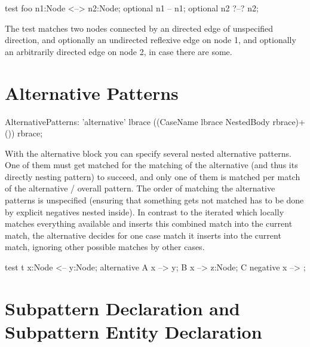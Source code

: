 \begin{example}
  \begin{grgen}
test foo {
  n1:Node <--> n2:Node;
  optional {
    n1 -- n1;
  }
  optional {
    n2 ?--? n2;
  }
}
  \end{grgen}
The test matches two nodes connected by an directed edge of unspecified direction, and optionally an undirected reflexive edge on node 1, and optionally an arbitrarily directed edge on node 2, in case there are some.
\end{example}

\section{Alternative Patterns}
\label{alternative}

\begin{rail}  
  AlternativePatterns: 
    'alternative' lbrace ((CaseName lbrace NestedBody rbrace)+()) rbrace;
\end{rail}

With the alternative block you can specify several nested alternative patterns. One of them must get matched for the matching of the alternative (and thus its directly nesting pattern) to succeed, and only one of them is matched per match of the alternative / overall pattern. The order of matching the alternative patterns is unspecified (ensuring that something gets not matched has to be done by explicit negatives nested inside). In contrast to the iterated which locally matches everything available and inserts this combined match into the current match, the alternative decides for one case match it inserts into the current match, ignoring other possible matches by other cases. 

\begin{example}
  \begin{grgen}
test t {
  x:Node <-- y:Node;
  alternative {
    A {
      x --> y;
    }
    B {
      x --> z:Node;
    }
    C {
      negative {
        x --> ;
      }
    }
  }
}
  \end{grgen}
\end{example}


\section{Subpattern Declaration and Subpattern Entity Declaration}
\label{sec:subpattern}

